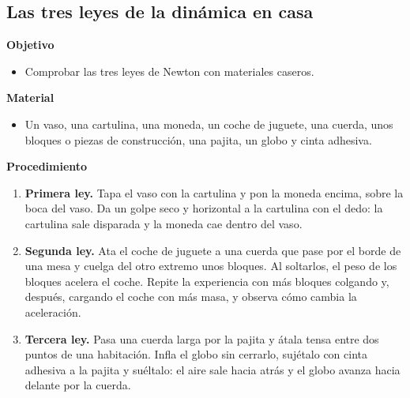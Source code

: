 \subsection{Las tres leyes de la dinámica en casa}

\noindent\begin{minipage}[t]{0.48\textwidth}
    \textbf{Objetivo}
    \begin{itemize}
        \item Comprobar las tres leyes de Newton con materiales caseros.
    \end{itemize}
\end{minipage}\hfill
\begin{minipage}[t]{0.48\textwidth}
    \textbf{Material}
    \begin{itemize}
        \item Un vaso, una cartulina, una moneda, un coche de juguete, una cuerda, unos bloques o piezas de construcción, una pajita, un
        globo y cinta adhesiva.
    \end{itemize}
\end{minipage}

\textbf{Procedimiento}
\begin{enumerate}[label=\numberballgreen]
    \item \textbf{Primera ley.} Tapa el vaso con la cartulina y pon la moneda encima, sobre la boca del vaso. Da un golpe seco y
    horizontal a la cartulina con el dedo: la cartulina sale disparada y la moneda cae dentro del vaso.
    \item \textbf{Segunda ley.} Ata el coche de juguete a una cuerda que pase por el borde de una mesa y cuelga del otro extremo unos
    bloques. Al soltarlos, el peso de los bloques acelera el coche. Repite la experiencia con más bloques colgando y, después,
    cargando el coche con más masa, y observa cómo cambia la aceleración.
    \item \textbf{Tercera ley.} Pasa una cuerda larga por la pajita y átala tensa entre dos puntos de una habitación. Infla el globo
    sin cerrarlo, sujétalo con cinta adhesiva a la pajita y suéltalo: el aire sale hacia atrás y el globo avanza hacia delante por la
    cuerda.
\end{enumerate}

